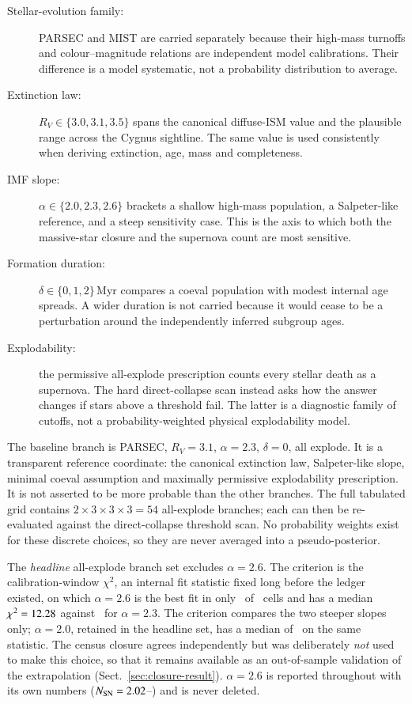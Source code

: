 \documentclass{aa}
\begin{document}
\begin{description}
\item[Stellar-evolution family:] PARSEC and MIST are carried separately because
their high-mass turnoffs and colour--magnitude relations are independent model
calibrations. Their difference is a model systematic, not a probability
distribution to average.
\item[Extinction law:] $R_V \in \{3.0,3.1,3.5\}$ spans the canonical diffuse-ISM
value and the plausible range across the Cygnus sightline. The same value is
used consistently when deriving extinction, age, mass and completeness.
\item[IMF slope:] $\alpha \in \{2.0,2.3,2.6\}$ brackets a shallow high-mass
population, a Salpeter-like reference, and a steep sensitivity case. This is the
axis to which both the massive-star closure and the supernova count are most
sensitive.
\item[Formation duration:] $\delta \in \{0,1,2\}$\,Myr compares a coeval
population with modest internal age spreads. A wider duration is not carried
because it would cease to be a perturbation around the independently inferred
subgroup ages.
\item[Explodability:] the permissive all-explode prescription counts every
stellar death as a supernova. The hard direct-collapse scan instead asks how the
answer changes if stars above a threshold fail. The latter is a diagnostic
family of cutoffs, not a probability-weighted physical explodability model.
\end{description}

The baseline branch is PARSEC, $R_V=3.1$, $\alpha=2.3$, $\delta=0$, all explode.
It is a transparent reference coordinate: the canonical extinction law,
Salpeter-like slope, minimal coeval assumption and maximally permissive
explodability prescription. It is not asserted to be more probable than the
other branches. The full tabulated grid contains $2\times3\times3\times3=54$
all-explode branches; each can then be re-evaluated against the direct-collapse
threshold scan. No probability weights exist for these discrete choices, so
they are never averaged into a pseudo-posterior.

The \emph{headline} all-explode branch set excludes $\alpha = 2.6$. The
criterion is the calibration-window $\chi^2$, an internal fit statistic fixed long before the
ledger existed, on which $\alpha = 2.6$ is the best fit in only \alphaSixWins\ of
\alphaCells\ cells and has a median $\chi^2 = 12.28$ against
\alphaThreeChi\ for $\alpha = 2.3$. The criterion compares the two steeper
slopes only; $\alpha = 2.0$, retained in the headline set, has a median of
\alphaTwoChi\ on the same statistic. The census closure agrees independently but
was deliberately \emph{not} used to make this choice, so that it remains
available as an out-of-sample validation of the extrapolation
(Sect.~\ref{sec:closure-result}). $\alpha = 2.6$ is reported throughout with its
own numbers ($N_{\rm SN} = 2.02$--\NSNdrophi) and is never deleted.
\end{document}
